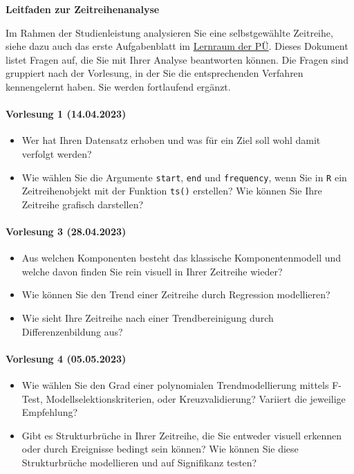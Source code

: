 \begin{center}
    \Large\sffamily
    \textbf{Leitfaden zur Zeitreihenanalyse}
\end{center}

Im Rahmen der Studienleistung analysieren Sie eine selbstgewählte Zeitreihe, siehe dazu auch das erste Aufgabenblatt im \href{https://moodle.uni-bielefeld.de/course/view.php?id=1035}{Lernraum der PÜ}. Dieses Dokument listet Fragen auf, die Sie mit Ihrer Analyse beantworten können. Die Fragen sind gruppiert nach der Vorlesung, in der Sie die entsprechenden Verfahren kennengelernt haben. Sie werden fortlaufend ergänzt.

\paragraph{Vorlesung 1 (14.04.2023)}
\begin{itemize}
    \item Wer hat Ihren Datensatz erhoben und was für ein Ziel soll wohl damit verfolgt werden?
    \item Wie wählen Sie die Argumente \texttt{start}, \texttt{end} und \texttt{frequency}, wenn Sie in \texttt{R} ein Zeitreihenobjekt mit der Funktion \texttt{ts()} erstellen? Wie können Sie Ihre Zeitreihe grafisch darstellen?
\end{itemize}

\paragraph{Vorlesung 3 (28.04.2023)}
\begin{itemize}
    \item Aus welchen Komponenten besteht das klassische Komponentenmodell und welche davon finden Sie rein visuell in Ihrer Zeitreihe wieder?
    \item Wie können Sie den Trend einer Zeitreihe durch Regression modellieren? 
    \item Wie sieht Ihre Zeitreihe nach einer Trendbereinigung durch Differenzenbildung aus?
\end{itemize}

\paragraph{Vorlesung 4 (05.05.2023)}
\begin{itemize}
    \item Wie wählen Sie den Grad einer polynomialen Trendmodellierung mittels F-Test, Modellselektionskriterien, oder Kreuzvalidierung? Variiert die jeweilige Empfehlung?
    \item Gibt es Strukturbrüche in Ihrer Zeitreihe, die Sie entweder visuell erkennen oder durch Ereignisse bedingt sein können? Wie können Sie diese Strukturbrüche modellieren und auf Signifikanz testen?
\end{itemize}
